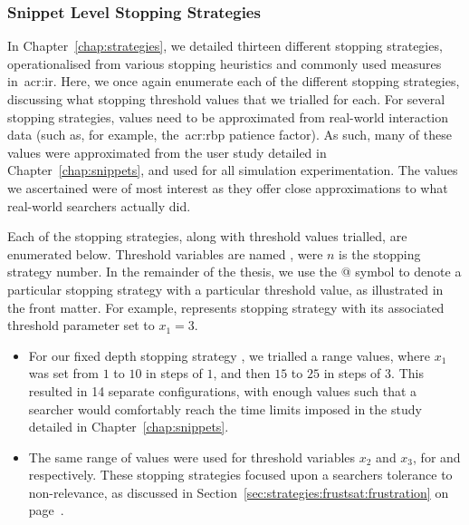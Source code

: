 \subsubsection{Snippet Level Stopping Strategies}\label{chap:csm:method:simulation:grounding:stopping_strats}
In Chapter~\ref{chap:strategies}, we detailed thirteen different stopping strategies, operationalised from various stopping heuristics and commonly used measures in~\gls{acr:ir}. Here, we once again enumerate each of the different stopping strategies, discussing what stopping threshold values that we trialled for each. For several stopping strategies, values need to be approximated from real-world interaction data (such as, for example, the~\gls{acr:rbp} patience factor). As such, many of these values were approximated from the user study detailed in Chapter~\ref{chap:snippets}, and used for all simulation experimentation. The values we ascertained were of most interest as they offer close approximations to what real-world searchers actually did.

Each of the stopping strategies, along with threshold values trialled, are enumerated below. Threshold variables are named , were $n$ is the stopping strategy number. In the remainder of the thesis, we use the @ symbol to denote a particular stopping strategy with a particular threshold value, as illustrated in the front matter. For example,  represents stopping strategy  with its associated threshold parameter set to $x_1=3$.

\begin{itemize}
    
    \item{For our fixed depth stopping strategy , we trialled a range values, where $x_1$ was set from $1$ to $10$ in steps of $1$, and then $15$ to $25$ in steps of $3$. This resulted in 14 separate configurations, with enough values such that a searcher would comfortably reach the time limits imposed in the study detailed in Chapter~\ref{chap:snippets}.}
    
    \item{The same range of values were used for threshold variables $x_2$ and $x_3$, for  and  respectively. These stopping strategies focused upon a searchers tolerance to non-relevance, as discussed in Section~\ref{sec:strategies:frustsat:frustration} on page~\pageref{sec:strategies:frustsat:frustration}.}
    
\end{itemize}

